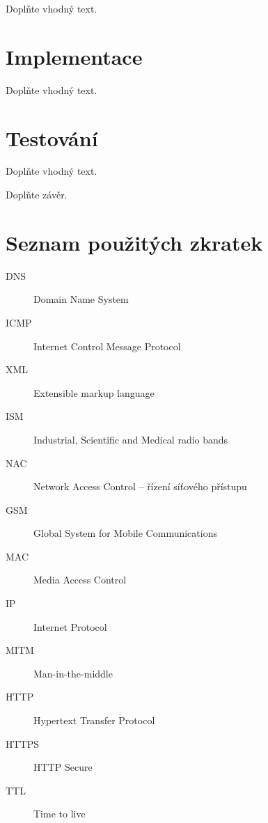 \documentclass[thesis=M,czech]{FITthesis}[2012/10/20]
\begin{document}
Doplňte vhodný text.

\chapter{Implementace}

Doplňte vhodný text.

\chapter{Testování}

Doplňte vhodný text.


\begin{conclusion}
	Doplňte závěr.
	
\end{conclusion}




\appendix

\chapter{Seznam použitých zkratek}



\begin{description}
	\item[DNS] Domain Name System
	\item[ICMP] Internet Control Message Protocol
	\item[XML] Extensible markup language
	\item[ISM] Industrial, Scientific and Medical radio bands
	\item[NAC] Network Access Control -- řízení síťového přístupu
	\item[GSM] Global System for Mobile Communications
	\item[MAC] Media Access Control
	\item[IP] Internet Protocol
	\item[MITM] Man-in-the-middle
	\item[HTTP] Hypertext Transfer Protocol
	\item[HTTPS] HTTP Secure
	\item[TTL] Time to live
\end{description}





\end{document}
